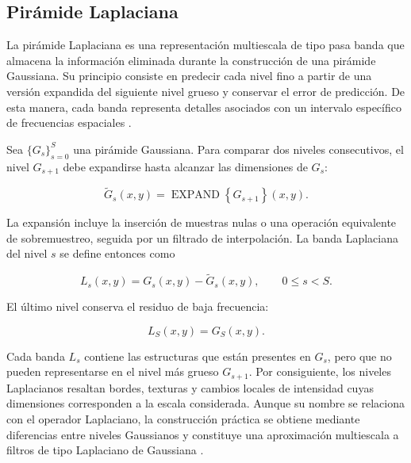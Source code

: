 \subsection{Pirámide Laplaciana}
	\label{subsubsec:piramide_laplaciana}

La pirámide Laplaciana es una representación multiescala de tipo pasa banda que almacena la información eliminada durante la construcción de una pirámide Gaussiana. Su principio consiste en predecir cada nivel fino a partir de una versión expandida del siguiente nivel grueso y conservar el error de predicción. De esta manera, cada banda representa detalles asociados con un intervalo específico de frecuencias espaciales \cite{burt1983laplacian}.

Sea $\{G_s\}_{s=0}^{S}$ una pirámide Gaussiana. Para comparar dos niveles consecutivos, el nivel $G_{s+1}$ debe expandirse hasta alcanzar las dimensiones de $G_s$:

\begin{equation}
    \widetilde{G}_{s}(x,y)
    =
    \operatorname{EXPAND}
    \left\{
        G_{s+1}
    \right\}(x,y).
    \label{eq:expansion_gaussiana}
\end{equation}

La expansión incluye la inserción de muestras nulas o una operación equivalente de sobremuestreo, seguida por un filtrado de interpolación. La banda Laplaciana del nivel $s$ se define entonces como

\begin{equation}
    L_s(x,y)
    =
    G_s(x,y)
    -
    \widetilde{G}_{s}(x,y),
    \qquad
    0\leq s<S.
    \label{eq:banda_laplaciana}
\end{equation}

El último nivel conserva el residuo de baja frecuencia:

\begin{equation}
    L_S(x,y)=G_S(x,y).
    \label{eq:residuo_baja_frecuencia}
\end{equation}

Cada banda $L_s$ contiene las estructuras que están presentes en $G_s$, pero que no pueden representarse en el nivel más grueso $G_{s+1}$. Por consiguiente, los niveles Laplacianos resaltan bordes, texturas y cambios locales de intensidad cuyas dimensiones corresponden a la escala considerada. Aunque su nombre se relaciona con el operador Laplaciano, la construcción práctica se obtiene mediante diferencias entre niveles Gaussianos y constituye una aproximación multiescala a filtros de tipo Laplaciano de Gaussiana \cite{burt1983laplacian,ahmed2023overview}.

